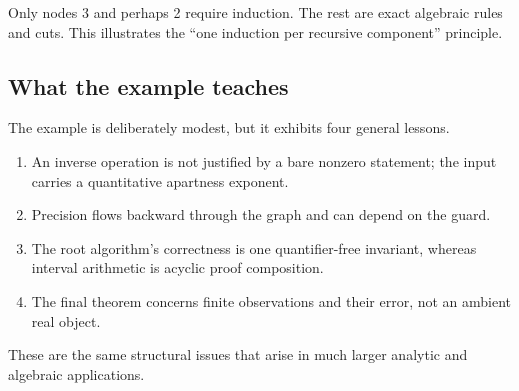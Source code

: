Only nodes 3 and perhaps 2 require induction.  The rest are exact algebraic
rules and cuts.  This illustrates the ``one induction per recursive component''
principle.

\subsection{What the example teaches}

The example is deliberately modest, but it exhibits four general lessons.

\begin{enumerate}
\item An inverse operation is not justified by a bare nonzero statement; the
input carries a quantitative apartness exponent.
\item Precision flows backward through the graph and can depend on the guard.
\item The root algorithm's correctness is one quantifier-free invariant,
whereas interval arithmetic is acyclic proof composition.
\item The final theorem concerns finite observations and their error, not an
ambient real object.
\end{enumerate}

These are the same structural issues that arise in much larger analytic and
algebraic applications.
